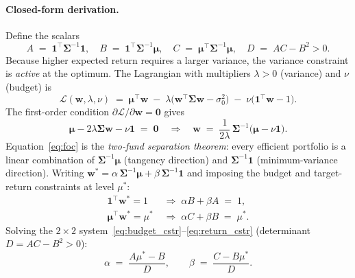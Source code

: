 \documentclass[11pt]{article}
\begin{document}
\paragraph{Closed-form derivation.}
Define the scalars
\begin{equation}
  A \;=\; \mathbf{1}^\top\boldsymbol{\Sigma}^{-1}\mathbf{1}, \quad
  B \;=\; \mathbf{1}^\top\boldsymbol{\Sigma}^{-1}\boldsymbol{\mu}, \quad
  C \;=\; \boldsymbol{\mu}^\top\boldsymbol{\Sigma}^{-1}\boldsymbol{\mu}, \quad
  D \;=\; AC - B^2 > 0.
  \label{eq:abcd}
\end{equation}
Because higher expected return requires a larger variance, the variance constraint
is \emph{active} at the optimum.  The Lagrangian with multipliers $\lambda>0$
(variance) and $\nu$ (budget) is
\begin{equation}
  \mathcal{L}(\mathbf{w},\lambda,\nu)
  \;=\;
  \boldsymbol{\mu}^\top\mathbf{w}
  \;-\; \lambda\bigl(\mathbf{w}^\top\boldsymbol{\Sigma}\mathbf{w} - \sigma_0^2\bigr)
  \;-\; \nu\bigl(\mathbf{1}^\top\mathbf{w} - 1\bigr).
  \label{eq:lagrangian}
\end{equation}
The first-order condition $\partial\mathcal{L}/\partial\mathbf{w}=\mathbf{0}$ gives
\begin{equation}
  \boldsymbol{\mu} - 2\lambda\boldsymbol{\Sigma}\mathbf{w} - \nu\mathbf{1}
  \;=\; \mathbf{0}
  \quad\Longrightarrow\quad
  \mathbf{w} \;=\; \frac{1}{2\lambda}\,\boldsymbol{\Sigma}^{-1}
    \bigl(\boldsymbol{\mu}-\nu\mathbf{1}\bigr).
  \label{eq:foc}
\end{equation}
Equation~\eqref{eq:foc} is the \emph{two-fund separation theorem}: every efficient
portfolio is a linear combination of $\boldsymbol{\Sigma}^{-1}\boldsymbol{\mu}$
(tangency direction) and $\boldsymbol{\Sigma}^{-1}\mathbf{1}$ (minimum-variance
direction).  Writing $\mathbf{w}^*=\alpha\,\boldsymbol{\Sigma}^{-1}\boldsymbol{\mu}
+\beta\,\boldsymbol{\Sigma}^{-1}\mathbf{1}$ and imposing the budget and target-return
constraints at level $\mu^*$:
\begin{align}
  \mathbf{1}^\top\mathbf{w}^*=1 &\;\Longrightarrow\; \alpha B + \beta A \;=\; 1,
  \label{eq:budget_cstr}\\
  \boldsymbol{\mu}^\top\mathbf{w}^*=\mu^*
  &\;\Longrightarrow\; \alpha C + \beta B \;=\; \mu^*.
  \label{eq:return_cstr}
\end{align}
Solving the $2\times2$ system~\eqref{eq:budget_cstr}--\eqref{eq:return_cstr}
(determinant $D=AC-B^2>0$):
\begin{equation}
  \alpha \;=\; \frac{A\mu^*-B}{D}, \qquad \beta \;=\; \frac{C-B\mu^*}{D}.
  \label{eq:alphabeta}
\end{equation}
\end{document}
